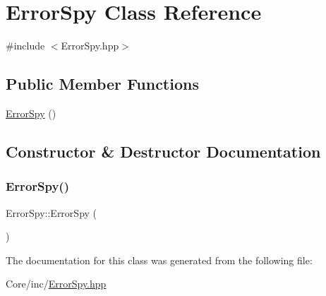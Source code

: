\hypertarget{class_error_spy}{}\section{Error\+Spy Class Reference}
\label{class_error_spy}


{\ttfamily \#include $<$Error\+Spy.\+hpp$>$}

\subsection*{Public Member Functions}
\begin{DoxyCompactItemize}
\item 
\hyperlink{class_error_spy_a8d07ccabb00ac3925d94d77e7092bc99}{Error\+Spy} ()
\end{DoxyCompactItemize}


\subsection{Constructor \& Destructor Documentation}
\mbox{\label{class_error_spy_a8d07ccabb00ac3925d94d77e7092bc99}} 
\subsubsection{\texorpdfstring{Error\+Spy()}{ErrorSpy()}}
{\footnotesize\ttfamily Error\+Spy\+::\+Error\+Spy (\begin{DoxyParamCaption}{ }\end{DoxyParamCaption})\hspace{0.3cm}{\ttfamily [inline]}}



The documentation for this class was generated from the following file\+:\begin{DoxyCompactItemize}
\item 
Core/inc/\hyperlink{_error_spy_8hpp}{Error\+Spy.\+hpp}\end{DoxyCompactItemize}
